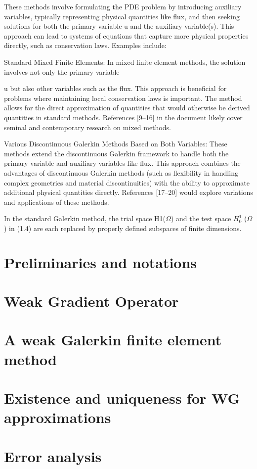 \documentclass[a4paper,11pt]{article} %
\begin{document}
These methods involve formulating the PDE problem by introducing auxiliary variables, typically representing physical quantities like flux, and then seeking solutions for both the primary variable 
u and the auxiliary variable(s). This approach can lead to systems of equations that capture more physical properties directly, such as conservation laws. Examples include:

Standard Mixed Finite Elements: In mixed finite element methods, the solution involves not only the primary variable 

u but also other variables such as the flux. This approach is beneficial for problems where maintaining local conservation laws is important. The method allows for the direct approximation of quantities that would otherwise be derived quantities in standard methods. References [9–16] in the document likely cover seminal and contemporary research on mixed methods.

Various Discontinuous Galerkin Methods Based on Both Variables: These methods extend the discontinuous Galerkin framework to handle both the primary variable and auxiliary variables like flux. This approach combines the advantages of discontinuous Galerkin methods (such as flexibility in handling complex geometries and material discontinuities) with the ability to approximate additional physical quantities directly. References [17–20] would explore variations and applications of these methods.

In the standard Galerkin method, the trial space H1($\Omega$) and the test space $H^1_0$ ($\Omega$) in (1.4) are each replaced by properly defined
subspaces of finite dimensions.

\section*{Preliminaries and notations}

\section*{Weak Gradient Operator}

\section*{A weak Galerkin finite element method}

\section*{Existence and uniqueness for WG approximations}

\section*{Error analysis}
\end{document}
